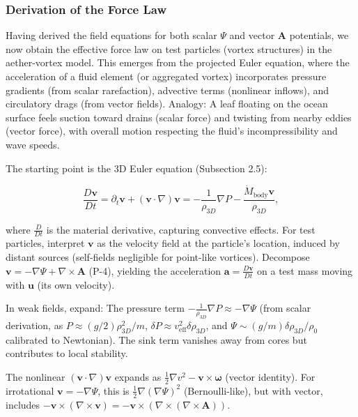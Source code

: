 \subsubsection{Derivation of the Force Law}

Having derived the field equations for both scalar $\Psi$ and vector $\mathbf{A}$ potentials, we now obtain the effective force law on test particles (vortex structures) in the aether-vortex model. This emerges from the projected Euler equation, where the acceleration of a fluid element (or aggregated vortex) incorporates pressure gradients (from scalar rarefaction), advective terms (nonlinear inflows), and circulatory drags (from vector fields). Analogy: A leaf floating on the ocean surface feels suction toward drains (scalar force) and twisting from nearby eddies (vector force), with overall motion respecting the fluid's incompressibility and wave speeds.

The starting point is the 3D Euler equation (Subsection 2.5):

\[
\frac{D \mathbf{v}}{Dt} = \partial_t \mathbf{v} + (\mathbf{v} \cdot \nabla) \mathbf{v} = -\frac{1}{\rho_{3D}} \nabla P - \frac{\dot{M}_{\text{body}} \mathbf{v}}{\rho_{3D}},
\]

where $\frac{D}{Dt}$ is the material derivative, capturing convective effects. For test particles, interpret $\mathbf{v}$ as the velocity field at the particle's location, induced by distant sources (self-fields negligible for point-like vortices). Decompose $\mathbf{v} = -\nabla \Psi + \nabla \times \mathbf{A}$ (P-4), yielding the acceleration $\mathbf{a} = \frac{D \mathbf{v}}{Dt}$ on a test mass moving with $\mathbf{u}$ (its own velocity).

In weak fields, expand: The pressure term $-\frac{1}{\rho_{3D}} \nabla P \approx - \nabla \Psi$ (from scalar derivation, as $P \approx (g / 2) \rho_{3D}^2 / m$, $\delta P \approx v_{\text{eff}}^2 \delta \rho_{3D}$, and $\Psi \sim (g / m) \delta \rho_{3D} / \rho_0$ calibrated to Newtonian). The sink term vanishes away from cores but contributes to local stability.

The nonlinear $(\mathbf{v} \cdot \nabla) \mathbf{v}$ expands as $\frac{1}{2} \nabla v^2 - \mathbf{v} \times \boldsymbol{\omega}$ (vector identity). For irrotational $\mathbf{v} = -\nabla \Psi$, this is $\frac{1}{2} \nabla (\nabla \Psi)^2$ (Bernoulli-like), but with vector, includes $- \mathbf{v} \times (\nabla \times \mathbf{v}) = - \mathbf{v} \times (\nabla \times (\nabla \times \mathbf{A}))$.

